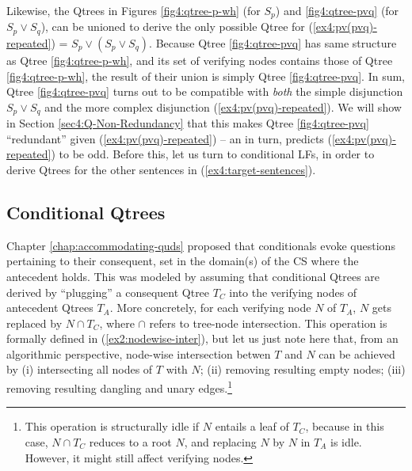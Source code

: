 Likewise, the Qtrees in Figures \ref{fig4:qtree-p-wh} (for $S_p$) and \ref{fig4:qtree-pvq} (for $S_p\vee S_q$), can be unioned to derive the only possible Qtree for (\ref{ex4:pv(pvq)-repeated}) = $S_p\vee(S_p\vee S_q)$. Because Qtree \ref{fig4:qtree-pvq} has same structure as Qtree \ref{fig4:qtree-p-wh}, and its set of verifying nodes contains those of Qtree \ref{fig4:qtree-p-wh}, the result of their union is simply Qtree \ref{fig4:qtree-pvq}. In sum, Qtree \ref{fig4:qtree-pvq} turns out to be compatible with \textit{both} the simple disjunction $S_p \vee S_q$ and the more complex disjunction (\ref{ex4:pv(pvq)-repeated}). We will show in Section \ref{sec4:Q-Non-Redundancy} that this makes Qtree \ref{fig4:qtree-pvq} ``redundant'' given (\ref{ex4:pv(pvq)-repeated}) -- an in turn, predicts (\ref{ex4:pv(pvq)-repeated}) to be odd. Before this, let us turn to conditional LFs, in order to derive Qtrees for the other sentences in (\ref{ex4:target-sentences}).

\subsection{Conditional Qtrees}\label{sec:cond-lfs}

Chapter \ref{chap:accommodating-quds} proposed that conditionals evoke questions pertaining to their consequent, set in the domain(s) of the CS where the antecedent holds. This was modeled by assuming that conditional Qtrees are derived by ``plugging'' a consequent Qtree $T_C$ into the verifying nodes of antecedent Qtrees $T_A$. More concretely, for each verifying node $N$ of $T_A$, $N$ gets replaced by $N \cap T_C$, where $\cap$ refers to tree-node intersection. This operation is formally defined in (\ref{ex2:nodewise-inter}), but let us just note here that, from an algorithmic perspective, node-wise intersection betwen $T$ and $N$ can be achieved by (i) intersecting all nodes of $T$ with $N$; (ii) removing resulting empty nodes; (iii) removing resulting dangling and unary edges.\footnote{This operation is structurally idle if $N$ entails a leaf of $T_C$, because in this case, $N \cap T_C$ reduces to a root $N$, and replacing $N$ by $N$ in $T_A$ is idle. However, it might still affect verifying nodes.}

